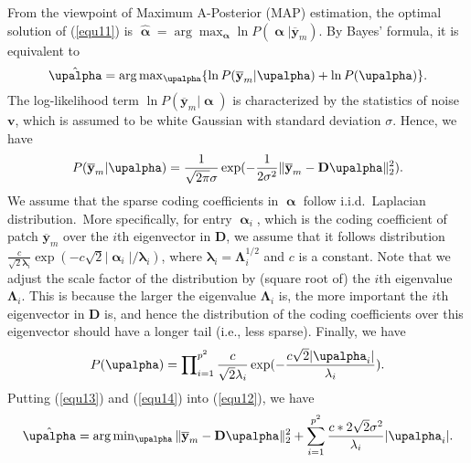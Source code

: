 From the viewpoint of Maximum A-Posterior (MAP) estimation, the optimal solution of (\ref{equ11}) is $\hat{\boldsymbol{\upalpha}} = \arg\max\nolimits_{\boldsymbol{\upalpha}}\ln P(\boldsymbol{\upalpha}|\mathbf{\overline{y}}_{m})$. By Bayes' formula, it is equivalent to
\begin{equation}\label{equ12}
\setlength{\abovedisplayskip}{3pt}
\setlength{\belowdisplayskip}{3pt}
\hat{\boldsymbol{\upalpha}} = \arg\max\nolimits_{\boldsymbol{\upalpha}}\{\ln P(\mathbf{\overline{y}}_{m}|\boldsymbol{\upalpha})+\ln P(\boldsymbol{\upalpha})\}.
\end{equation}
The log-likelihood term $\ln P(\mathbf{\overline{y}}_{m}|\boldsymbol{\upalpha})$ is characterized by the statistics of noise $\mathbf{v}$, which is assumed to be white Gaussian with standard deviation $\sigma$. Hence, we have
\begin{equation}\label{equ13}
\setlength{\abovedisplayskip}{3pt}
\setlength{\belowdisplayskip}{3pt}
P(\mathbf{\overline{y}}_{m}|\boldsymbol{\upalpha}) = \frac{1}{\sqrt{2\pi}\sigma}\exp(-\frac{1}{2\sigma^{2}}\|\mathbf{\overline{y}}_{m}-\mathbf{D}\boldsymbol{\upalpha}\|_{2}^{2}).
\end{equation}
We assume that the sparse coding coefficients in $\boldsymbol{\upalpha}$ follow i.i.d.\ Laplacian distribution.\ More specifically, for entry $\boldsymbol{\upalpha}_{i}$, which is the coding coefficient of patch $\mathbf{\overline{y}}_{m}$ over the $i$th eigenvector in $\mathbf{D}$, we assume that it follows distribution $\frac{c}{\sqrt{2}\mathbf{\lambda}_{i}}\exp(-c\sqrt{2}|\boldsymbol{\upalpha}_{i}|/\mathbf{\lambda}_{i})$, where $\mathbf{\lambda}_{i}=\mathbf{\Lambda}_{i}^{1/2}$ and $c$ is a constant. Note that we adjust the scale factor of the distribution by (square root of) the $i$th eigenvalue $\mathbf{\Lambda}_{i}$. This is because the larger the eigenvalue $\mathbf{\Lambda}_{i}$ is, the more important the $i$th eigenvector in $\mathbf{D}$ is, and hence the distribution of the coding coefficients over this eigenvector should have a longer tail (i.e., less sparse). Finally, we have
\begin{equation}\label{equ14}
\setlength{\abovedisplayskip}{3pt}
\setlength{\belowdisplayskip}{4pt}
P(\boldsymbol{\upalpha})=\prod\nolimits_{i=1}^{p^{2}}\frac{c}{\sqrt{2}\mathbf{\lambda}_{i}}\exp(-\frac{c\sqrt{2}|\boldsymbol{\upalpha}_{i}|}{\mathbf{\lambda}_{i}}).
\end{equation}
Putting (\ref{equ13}) and (\ref{equ14}) into (\ref{equ12}), we have
\begin{equation}\label{equ15}
\setlength{\abovedisplayskip}{3pt}
\setlength{\belowdisplayskip}{4pt}
\hat{\boldsymbol{\upalpha}}=\arg\min\nolimits_{\boldsymbol{\upalpha}}\|\mathbf{\overline{y}}_{m}-\mathbf{D}\boldsymbol{\upalpha}\|_{2}^{2}+\sum_{i=1}^{p^{2}}\frac{c*2\sqrt{2}\sigma^{2}}{\mathbf{\lambda}_{i}}|\boldsymbol{\upalpha}_{i}|.
\end{equation}
